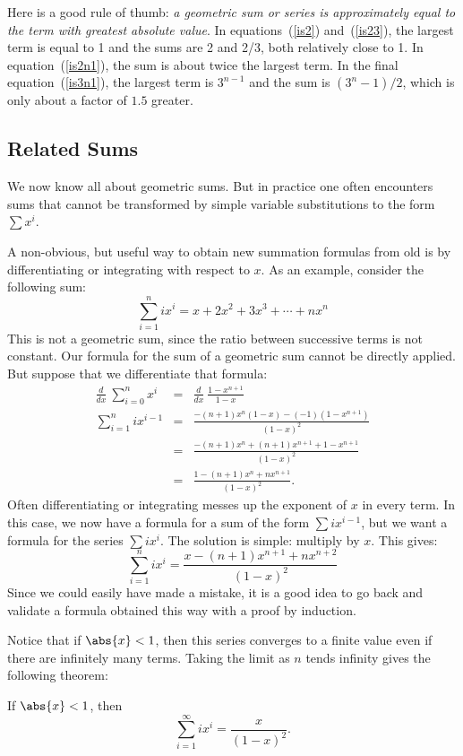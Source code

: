 Here is a good rule of thumb: {\em a geometric sum or series is
approximately equal to the term with greatest absolute value}.  In
equations~(\ref{is2}) and~(\ref{is23}), the largest term is equal to 1 and
the sums are 2 and 2/3, both relatively close to 1.  In
equation~(\ref{is2n1}), the sum is about twice the largest term.  In the
final equation~(\ref{is3n1}), the largest term is $3^{n-1}$ and the sum is
$(3^n-1)/2$, which is only about a factor of $1.5$ greater.


\subsection{Related Sums}

We now know all about geometric sums.  But in practice one often
encounters sums that cannot be transformed by simple variable
substitutions to the form $\sum x^i$.

A non-obvious, but useful way to obtain new summation formulas from
old is by differentiating or integrating with respect to $x$.  As an
example, consider the following sum:
\[
\sum_{i=1}^n i x^i = x + 2 x^2 + 3 x^3 + \cdots + n x^n
\]
This is not a geometric sum, since the ratio between successive
terms is not constant.  Our formula for the sum of a geometric sum
cannot be directly applied.  But suppose that we differentiate that
formula:
\begin{eqnarray*}
\frac{d}{dx} \ \sum_{i=0}^{n} x^i
  & = & \frac{d}{dx} \ \frac{1 - x^{n+1}}{1 - x} \\
\sum_{i=1}^{n} i x^{i-1}
 & = & \frac{-(n+1)x^n (1-x) - (-1)(1-x^{n+1})}{(1 - x)^2} \\
 & = & \frac{-(n+1)x^n + (n+1)x^{n+1} + 1 - x^{n+1}}{(1 - x)^2} \\
 & = & \frac{1 - (n+1)x^n + n x^{n+1}}{(1 - x)^2}.
\end{eqnarray*}
Often differentiating or integrating messes up the exponent of $x$ in
every term.  In this case, we now have a formula for a sum of the
form $\sum i x^{i-1}$, but we want a formula for the series $\sum i
x^i$.  The solution is simple: multiply by $x$.  This gives:
\[
\sum_{i=1}^{n} i x^i = \frac{x - (n+1)x^{n+1} + n x^{n+2}}{(1 - x)^2}
\]
Since we could easily have made a mistake, it is a good idea to go
back and validate a formula obtained this way with a proof by
induction.

Notice that if $\abs{x} < 1$, then this series converges to a finite value
even if there are infinitely many terms.  Taking the limit as $n$ tends
infinity gives the following theorem:
\begin{theorem}\label{th:inf_ixi}
If $\abs{x} < 1$, then
\[
\sum_{i=1}^\infty i x^i = \frac{x}{(1-x)^2}.
\]
\end{theorem}


